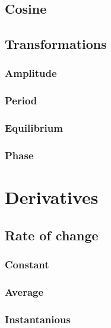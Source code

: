 \documentclass{book}
\begin{document}
\section{Cosine}
\begin{center}
\end{center}

\section{Transformations}
\subsection{Amplitude}

\subsection{Period}

\subsection{Equilibrium}

\subsection{Phase}

\chapter{Derivatives}
\section{Rate of change}
\subsection{Constant}

\subsection{Average}

\subsection{Instantanious}
\end{document}
